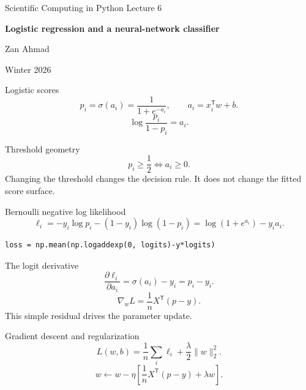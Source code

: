 \documentclass[aspectratio=169,11pt]{beamer}
\newcommand{\notestarget}{notes.pdf}\newcommand{\noteslabel}{Notes}
\begin{document}
\begin{frame}[plain]\vfill
{\small\color{accent} Scientific Computing in Python \quad Lecture 6}\par\medskip
{\raggedright{}\LARGE\bfseries\color{ink} Logistic regression and a neural-network classifier}\par\bigskip
Zan Ahmad\par\smallskip
{\small Winter 2026}\par\vfill\end{frame}
\renewcommand{\notestarget}{notes.pdf\#note-logistic-scores}
\begin{frame}[t,fragile,label=slide-logistic-scores]{Logistic scores}
\[
p_i=\sigma(a_i)=\frac1{1+e^{-a_i}},\qquad a_i=x_i^{\mathsf T}w+b.
\]
\pause{}
\[
\log\frac{p_i}{1-p_i}=a_i.
\]
\end{frame}
\renewcommand{\notestarget}{notes.pdf\#note-logistic-scores}
\begin{frame}[t,fragile,label=slide-threshold-geometry]{Threshold geometry}
\[
p_i\geq\frac12\iff a_i\geq0.
\]
\pause{}
Changing the threshold changes the decision rule. It does not change the fitted score surface.
\end{frame}
\renewcommand{\notestarget}{notes.pdf\#note-bernoulli-negative-log-likelihood}
\begin{frame}[t,fragile,label=slide-bernoulli-negative-log-likelihood]{Bernoulli negative log likelihood}
\[
\ell_i=-y_i\log p_i-(1-y_i)\log(1-p_i)
=\log(1+e^{a_i})-y_ia_i.
\]
\pause{}
\begin{verbatim}
loss = np.mean(np.logaddexp(0, logits)-y*logits)
\end{verbatim}
\end{frame}
\renewcommand{\notestarget}{notes.pdf\#note-bernoulli-negative-log-likelihood}
\begin{frame}[t,fragile,label=slide-the-logit-derivative]{The logit derivative}
\[
\frac{\partial\ell_i}{\partial a_i}=\sigma(a_i)-y_i=p_i-y_i.
\]
\pause{}
\[
\nabla_wL=\frac1nX^{\mathsf T}(p-y).
\]
This simple residual drives the parameter update.
\end{frame}
\renewcommand{\notestarget}{notes.pdf\#note-gradient-descent-and-regularization}
\begin{frame}[t,fragile,label=slide-gradient-descent-and-regularization]{Gradient descent and regularization}
\[
L(w,b)=\frac1n\sum_i\ell_i+\frac\lambda2\|w\|_2^2.
\]
\pause{}
\[
w\leftarrow w-\eta\left[\frac1nX^{\mathsf T}(p-y)+\lambda w\right].
\]
\end{frame}
\end{document}
